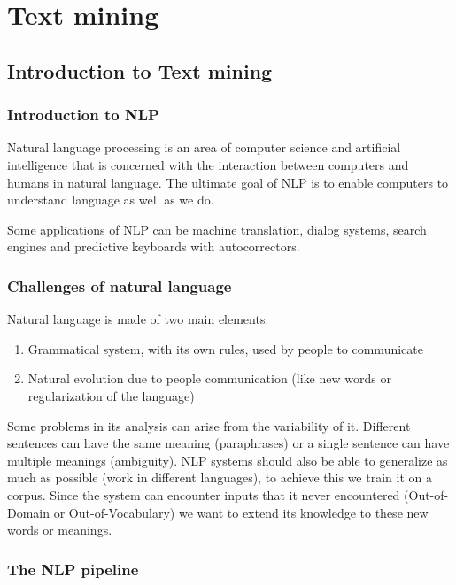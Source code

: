 \section{Text mining}

\subsection{Introduction to Text mining}
\subsubsection{Introduction to NLP}

Natural language processing is an area of computer science and artificial intelligence that is concerned with the interaction between computers and humans in natural language. The ultimate goal of NLP is to enable computers to understand language as well as we do.

Some applications of NLP can be machine translation, dialog systems, search engines and predictive keyboards with autocorrectors. 

\subsubsection{Challenges of natural language}

Natural language is made of two main elements:
\begin{enumerate}
    \item Grammatical system, with its own rules, used by people to communicate
    \item Natural evolution due to people communication (like new words or regularization of the language)
\end{enumerate}

\vspace{10pt}

Some problems in its analysis can arise from the variability of it. Different sentences can have the same meaning (paraphrases) or a single sentence can have multiple meanings (ambiguity). NLP systems should also be able to generalize as much as possible (work in different languages), to achieve this we train it on a corpus. Since the system can encounter inputs that it never encountered (Out-of-Domain or Out-of-Vocabulary) we want to extend its knowledge to these new words or meanings.


\subsubsection{The NLP pipeline}

